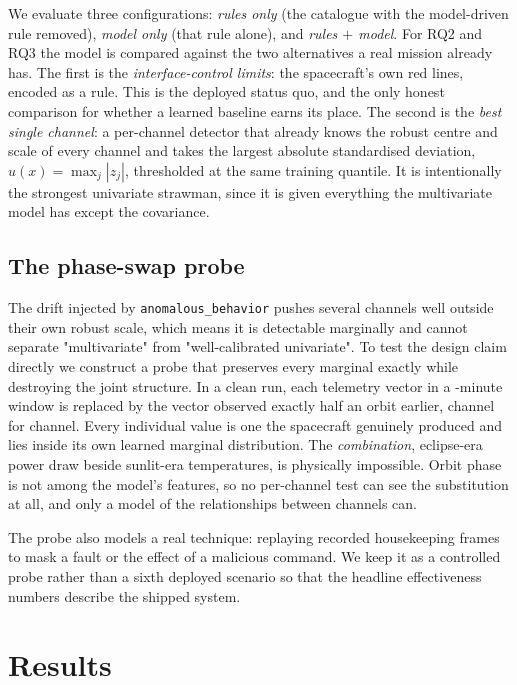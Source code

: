 \documentclass[10pt,journal]{IEEEtran}
\begin{document}
We evaluate three configurations: \emph{rules only} (the catalogue with the
model-driven rule removed), \emph{model only} (that rule alone), and \emph{rules
$+$ model}. For RQ2 and RQ3 the model is compared against the two alternatives a
real mission already has. The first is the \emph{interface-control limits}: the
spacecraft's own red lines, encoded as a rule. This is the deployed status quo,
and the only honest comparison for whether a learned baseline earns its place.
The second is the \emph{best single channel}: a per-channel detector that
already knows the robust centre and scale of every channel and takes the largest
absolute standardised deviation, $u(x) = \max_j |z_j|$, thresholded at the same
training quantile. It is intentionally the strongest univariate strawman,
since it is given everything the multivariate model has except the
covariance.

\subsection{The phase-swap probe}
\label{sec:probe}

The drift injected by \texttt{anomalous\_behavior} pushes several channels well
outside their own robust scale, which means it is detectable marginally and
cannot separate "multivariate" from "well-calibrated univariate". To test the
design claim directly we construct a probe that preserves every marginal exactly
while destroying the joint structure. In a clean run, each telemetry vector in a
\expSwapWindowMin-minute window is replaced by the vector observed exactly half
an orbit earlier, channel for channel. Every individual value is one the
spacecraft genuinely produced and lies inside its own learned marginal
distribution. The \emph{combination}, eclipse-era power draw beside
sunlit-era temperatures, is physically impossible. Orbit phase is not among the
model's features, so no per-channel test can see the substitution at all, and
only a model of the relationships between channels can.

The probe also models a real technique: replaying recorded housekeeping frames
to mask a fault or the effect of a malicious command. We keep it as a controlled
probe rather than a sixth deployed scenario so that the headline effectiveness
numbers describe the shipped system.

\section{Results}
\label{sec:results}
\end{document}
